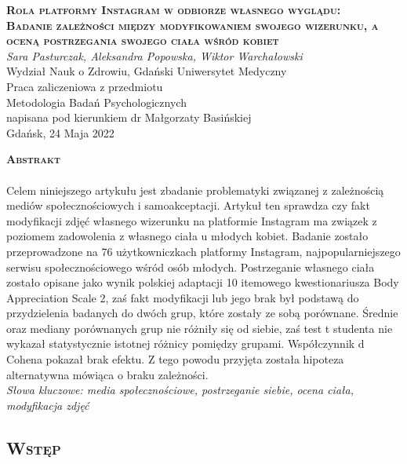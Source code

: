 \documentclass[12pt,a4paper,final,oneside,onecolumn,titlepage]{article}
\begin{document}
\pagestyle{fancy}
\fancyhead{}
\fancyfoot{}
\rhead{\thepage}

\begin{titlepage}
  \thispagestyle{empty}
  \rhead{\thepage}
  \begin{center}
  \vspace*{1cm}
  \Large
  \textbf{\textsc{Rola platformy Instagram w odbiorze własnego wyglądu:\\ Badanie zależności między modyfikowaniem swojego wizerunku, a oceną postrzegania swojego ciała wśród kobiet\\}}
  \vspace{1.5cm}
  \textit{Sara Pasturczak, Aleksandra Popowska, Wiktor Warchałowski\\}
  Wydział Nauk o Zdrowiu, Gdański Uniwersytet Medyczny\\
  \vspace{3cm}
  Praca zaliczeniowa z przedmiotu \\ Metodologia Badań Psychologicznych \\ napisana pod kierunkiem dr Małgorzaty Basińskiej\\
  \vspace{3cm}
  Gdańsk, 24 Maja 2022
  \end{center}
\end{titlepage}
\begin{center}
  \vspace*{0.5cm}
  \large{\textbf{\textsc{Abstrakt}}}
\end{center}
\paragraph{}
Celem niniejszego artykułu jest zbadanie problematyki związanej z zależnością mediów społecznościowych i samoakceptacji. Artykuł ten sprawdza czy fakt modyfikacji zdjęć własnego wizerunku na platformie Instagram ma związek z poziomem zadowolenia z własnego ciała u młodych kobiet. Badanie zostało przeprowadzone na 76 użytkowniczkach platformy Instagram, najpopularniejszego serwisu społecznościowego wśród osób młodych. Postrzeganie własnego ciała zostało opisane jako wynik polskiej adaptacji 10 itemowego kwestionariusza Body Appreciation Scale 2, zaś fakt modyfikacji lub jego brak był podstawą do przydzielenia badanych do dwóch grup, które zostały ze sobą porównane. Średnie oraz mediany porównanych grup nie różniły się od siebie, zaś test t studenta nie wykazał statystycznie istotnej różnicy pomiędzy grupami. Współczynnik d Cohena pokazał brak efektu. Z tego powodu przyjęta została hipoteza alternatywna mówiąca o braku zależności.\\
\textit{Słowa kluczowe: media społecznościowe, postrzeganie siebie, ocena ciała, modyfikacja zdjęć}
\newpage
\begin{center}
\section*{\large{\textbf{\textsc{Wstęp}}}}
\end{center}
\end{document}
